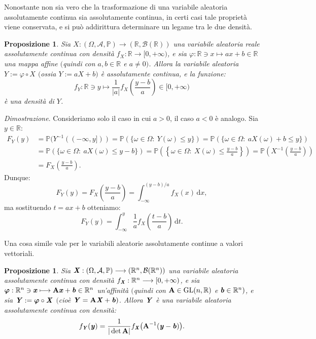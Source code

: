 \documentclass[11pt]{book}
\makeatletter
\theoremstyle{Definizione}
\theoremstyle{TeoremaProposizioneLemmaCorollario}
\newtheorem{mypropo}[myteo]{Proposizione}
\theoremstyle{OsservazioneNota}
\renewenvironment{proof}[1][\proofname]{\par
  \normalfont \topsep6\p@\@plus6\p@\relax
  \trivlist
  \item[\hskip\labelsep
        \itshape
    #1\@addpunct{.}]\ignorespaces
}{%
  \endtrivlist\@endpefalse
}
\newcommand{\R}{\mathbb{R}}
\newcommand{\gro}[1]{\textbf{\textup{#1}}}
\newcommand{\mybold}[1]{\boldsymbol{#1}}
\newcommand{\gri}[1]{\textbf{\textit{{#1}}}}
\renewcommand{\P}{\mathbb{P}}
\renewcommand{\d}{\mathrm{d}}
\newcommand{\dx}{\,\d x}
\newcommand{\dt}{\,\d t}
\renewenvironment{proof}{\textsl{Dimostrazione}.}{}
\makeatother
\begin{document}
Nonostante non sia vero che la trasformazione di una variabile aleatoria assolutamente continua sia assolutamente continua, in certi casi tale proprietà viene conservata, e si può addirittura determinare un legame tra le due densità.
\begin{boxpro}
\begin{mypropo}\label{pro:TrasformazioneAffineVAAssolutamenteContinua}
Sia $X:(\Omega,\mathcal{A},\P) \longrightarrow (\R,\mathcal{B}(\R))$ una variabile aleatoria reale assolutamente continua con densità $f_X:\R\longrightarrow [0,+\infty)$, e sia $\varphi:\R\ni x \longmapsto ax+b\in \R$ una mappa affine $($quindi con $a,b\in \R$ e $a\neq 0)$. Allora la variabile aleatoria $Y:= \varphi \circ X$ $($ossia $Y := aX+b)$ è assolutamente continua, e la funzione:
$$
f_Y:\R\ni y \longmapsto \frac{1}{|a|} f_X\left(\frac{y-b}{a}\right)\in [0,+\infty)
$$
è una densità di $Y$.
\end{mypropo}
\tcblower
\begin{proof}
Consideriamo solo il caso in cui $a > 0$, il caso $a < 0$ è analogo. Sia $y\in \R$:
\begin{align*}
F_Y(y) &= \P(Y^{-1}((-\infty,y])) = \P(\{\omega\in \Omega:\ Y(\omega) \leq y\}) = \P(\{\omega\in\Omega:\ aX(\omega)+b \leq y\})\\
&= \P(\{\omega\in \Omega:\ aX(\omega) \leq y-b\}) = \P\left(\left\{\omega\in \Omega:\ X(\omega) \leq \frac{y-b}{a}\right\}\right) = \P\left(X^{-1}\left(\frac{y-b}{a}\right)\right)\\
&= F_X\left(\frac{y-b}{a}\right).
\end{align*}
Dunque:
$$
F_Y(y) = F_X\left(\frac{y-b}{a}\right) = \int_{-\infty}^{(y-b)/a}f_X(x) \dx,
$$
ma sostituendo $t = ax+b$ otteniamo:
$$
F_Y(y) = \int_{-\infty}^{y}\frac{1}{a}f_X\left(\frac{t-b}{a}\right)\dt.
$$
\end{proof}
\end{boxpro}
\noindent
Una cosa simile vale per le variabili aleatorie assolutamente continue a valori vettoriali.
\begin{boxpro}
\begin{mypropo}
Sia $\gri{X}:(\Omega,\mathcal{A},\P)\longrightarrow (\R^n,\mathcal{B}(\R^n))$ una variabile aleatoria assolutamente continua con densità $f_{\gri{X}}:\R^n \longrightarrow [0,+\infty)$, e sia $\mybold{\varphi}:\R^n \ni \gri{x} \longmapsto \gro{A}\gri{x}+\gri{b}\in \R^n$ un'affinità $($quindi con $\gro{A}\in \textup{GL}(n,\R)$ e $\gri{b}\in \R^n)$, e sia $\gri{Y}:= \mybold{\varphi}\circ \gri{X}$ $($cioè $\gri{Y} = \gro{A}\gri{X}+\gri{b})$. Allora $\gri{Y}$ è una variabile aleatoria assolutamente continua con densità:
$$
f_{\gri{Y}}(\gri{y}) = \frac{1}{|\det\gro{A}|}f_{\gri{X}}\big(\gro{A}^{-1}(\gri{y}-\gri{b})\big).
$$
\end{mypropo}
\end{boxpro}
\end{document}
